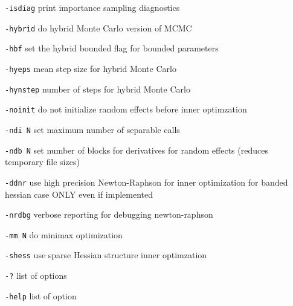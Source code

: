 \documentclass[a4paper,10pt,notumble]{leaflet}
\begin{document}
{\verb|-isdiag|         print importance sampling diagnostics

\verb|-hybrid|         do hybrid Monte Carlo version of MCMC

\verb|-hbf|            set the hybrid bounded flag for bounded parameters

\verb|-hyeps|          mean step size for hybrid Monte Carlo

\verb|-hynstep|        number of steps for hybrid Monte Carlo

\verb|-noinit|         do not initialize random effects before inner optimzation

\verb|-ndi N|          set maximum number of separable calls

\verb|-ndb N|          set number of blocks for derivatives for random effects (reduces temporary file sizes)

\verb|-ddnr|           use high precision Newton-Raphson for inner optimization for banded hessian case ONLY even if implemented

\verb|-nrdbg|           verbose reporting for debugging newton-raphson

\verb|-mm N|          do minimax optimization

\verb|-shess|         use sparse Hessian structure inner optimzation

\verb|-?|     list of options

\verb|-help|     list of option
}
\end{document}
